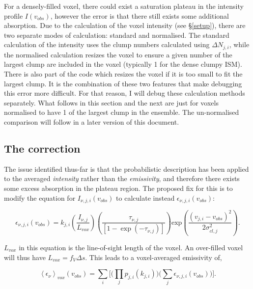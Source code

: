 \documentclass[a4paper]{article}
\begin{document}
    For a densely-filled voxel, there could exist a saturation plateau in the intensity profile \(I(v_{obs})\), however the error is that there still exists some additional absorption.
    Due to the calculation of the voxel intensity (see \S \ref{setup}), there are two separate modes of calculation: standard and normalised.
    The standard calculation of the intensity uses the clump numbers calculated using \(\Delta N_{j,i}\), while the normalised calculation resizes the voxel to ensure a given number of the largest clump are included in the voxel (typically 1 for the dense clumpy ISM).
    There is also part of the code which resizes the voxel if it is too small to fit the largest clump.
    It is the combination of these two features that make debugging this error more difficult.
    For that reason, I will debug these calculation methods separately.
    What follows in this section and the next are just for voxels normalised to have 1 of the largest clump in the ensemble.
    The un-normalised comparison will follow in a later version of this document.

    \subsection{The correction}

    The issue identified thus-far is that the probabilistic description has been applied to the averaged \textit{intensity} rather than the \textit{emissivity}, and therefore there exists some excess absorption in the plateau region.
    The proposed fix for this is to modify the equation for \(I_{\nu, j, i} (v_{obs})\) to calculate instead \(\epsilon_{\nu, j, i} (v_{obs})\):

    \begin{equation}
    \label{corrected emissivity}
    \epsilon_{\nu,j,i} (v_{obs}) = k_{j,i} \left( \frac{I_{\nu,j}}{L_{vox}} \right) \left(\frac{\tau_{\nu,j}}{\left[ 1 - \exp(- \tau_{\nu,j}) \right]} \right) \mathrm{exp} \left( \frac{(v_{j,i}-v_{obs})^2}{2\sigma_{cl,j}^2} \right).
    \end{equation}

    \(L_{vox}\) in this equation is the line-of-sight length of the voxel. An over-filled voxel will thus have \(L_{vox} = f_V \Delta s\). This leads to a voxel-averaged emissivity of,

    \begin{equation}
    \label{corrected voxel-averaged emissivity}
    \left< \epsilon_\nu \right>_{vox} (v_{obs}) = \sum_i \bigg[ \Big( \prod_j p_{j,i}(k_{j,i}) \Big) \Big( \sum_j \epsilon_{\nu,j,i} (v_{obs}) \Big) \bigg].
    \end{equation}
\end{document}
